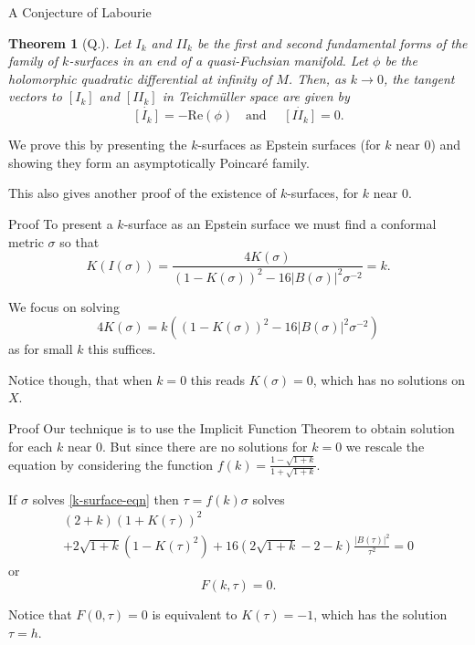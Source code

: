 \documentclass[professionalfont]{beamer}
\newtheorem{thm}{Theorem}[section]
\newcommand{\two}{I\!I}
\begin{document}
\begin{frame}{A Conjecture of Labourie}
 
\begin{thm}[Q.] \label{labourie-conjecture-proof}
Let $I_k$ and $\two_k$ be the first and second fundamental forms of the family of $k$-surfaces in an end of a quasi-Fuchsian manifold. 
Let $\phi$ be the holomorphic quadratic differential at infinity of $M$. 
Then, as $k \to 0$, the tangent vectors to $[I_k]$ and $[\two_k]$ in Teichm\"uller space are given by 
\[
\dot{[I_k]} = - \mathrm{Re}(\phi) \quad \text{and } \quad   \dot{[\two_k]} = 0.
\]
\end{thm} \pause

\vspace{0.5cm}

We prove this by presenting the $k$-surfaces as Epstein surfaces (for $k$ near 0) and showing they form an asymptotically Poincar\'e family.
\newline

This also gives another proof of the existence of $k$-surfaces, for $k$ near 0.

\end{frame}




\begin{frame}{Proof}
To present a $k$-surface as an Epstein surface we must find a conformal metric $\sigma$ so that
\[
K(I(\sigma)) = \frac{4K(\sigma)}{(1-K(\sigma))^2 - 16|B(\sigma)|^2\sigma^{-2}} = k.
\] \pause

We focus on solving 
\begin{equation}\tag{$\ast$}\label{k-surface-eqn}
4K(\sigma) = k \left((1-K(\sigma))^2 - 16|B(\sigma)|^2\sigma^{-2} \right)
\end{equation}
as for small $k$ this suffices. 
\newline \pause


Notice though, that when $k=0$ this reads $K(\sigma) = 0$, which has no solutions on $X$.
\end{frame}




\begin{frame}{Proof}
Our technique is to use the Implicit Function Theorem to obtain solution for each $k$ near 0. But since there are no solutions for $k = 0$ we rescale the equation by considering the function $f(k) = \frac{1-\sqrt{1+k}}{1+\sqrt{1+k}}$. 
\newline \pause

If $\sigma$ solves \eqref{k-surface-eqn} then $\tau = f(k)\sigma$ solves 
\begin{multline*}
(2+k)(1+K(\tau))^2  \\ + 2\sqrt{1+k}\left(1-K(\tau)^2 \right) +16\left(2\sqrt{1+k} - 2 - k  \right)\frac{|B(\tau)|^2}{\tau^2} = 0
\end{multline*}or 
\[
F(k,\tau) = 0.
\]\pause


Notice that $F(0,\tau) = 0$ is equivalent to $K(\tau) = -1$, which has the solution $\tau = h$. 
\end{frame}
\end{document}
